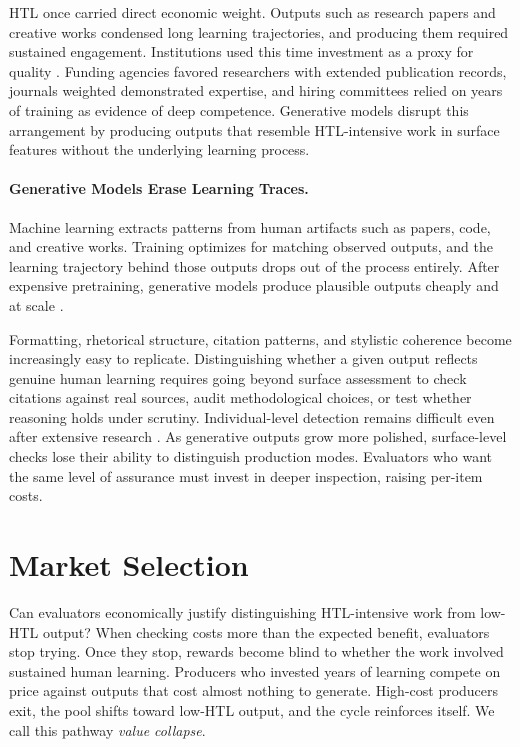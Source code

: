 \documentclass{article}
\theoremstyle{plain}
\theoremstyle{definition}
\theoremstyle{remark}
\begin{document}
HTL once carried direct economic weight. Outputs such as research papers and creative works condensed long learning trajectories, and producing them required sustained engagement. Institutions used this time investment as a proxy for quality \citep{spence1973signaling}. Funding agencies favored researchers with extended publication records, journals weighted demonstrated expertise, and hiring committees relied on years of training as evidence of deep competence. Generative models disrupt this arrangement by producing outputs that resemble HTL-intensive work in surface features without the underlying learning process. 

\vspace{-3pt}

\paragraph{Generative Models Erase Learning Traces.}
\label{sec:tech}

Machine learning extracts patterns from human artifacts such as papers, code, and creative works. Training optimizes for matching observed outputs, and the learning trajectory behind those outputs drops out of the process entirely. After expensive pretraining, generative models \citep{NIPS2017_3f5ee243, NEURIPS2020_4c5bcfec, lipman2023flow} produce plausible outputs cheaply and at scale \citep{NEURIPS2020_1457c0d6, openai2024gpt4technicalreport, deepseekai2025deepseekv3technicalreport}.

Formatting, rhetorical structure, citation patterns, and stylistic coherence become increasingly easy to replicate. Distinguishing whether a given output reflects genuine human learning requires going beyond surface assessment to check citations against real sources, audit methodological choices, or test whether reasoning holds under scrutiny. Individual-level detection remains difficult even after extensive research \citep{liang-etal-2025-quantifying}. As generative outputs grow more polished, surface-level checks lose their ability to distinguish production modes. Evaluators who want the same level of assurance must invest in deeper inspection, raising per-item costs.


\section{Market Selection}
\label{sec:mechanism}



Can evaluators economically justify distinguishing HTL-intensive work from low-HTL output? When checking costs more than the expected benefit, evaluators stop trying. Once they stop, rewards become blind to whether the work involved sustained human learning. Producers who invested years of learning compete on price against outputs that cost almost nothing to generate. High-cost producers exit, the pool shifts toward low-HTL output, and the cycle reinforces itself. We call this pathway \emph{value collapse}.
\end{document}
